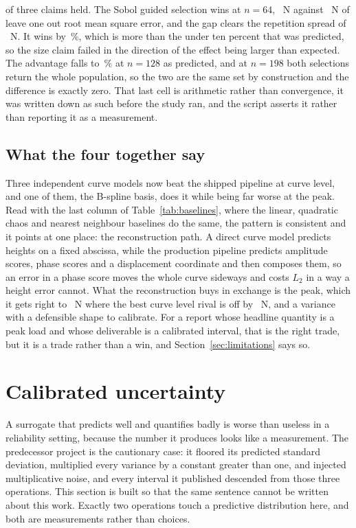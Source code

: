 \documentclass[11pt,a4paper]{article}
\begin{document}
\AblationFiveClaimsHeld{} of three claims held. The Sobol guided selection wins at $n = 64$,
\AblationFiveSobolSmall~N against \AblationFiveRandomSmall~N of leave one out root mean square
error, and the gap clears the repetition spread of \AblationFiveSpreadSmall~N. It wins by
\AblationFiveAdvantageSmall\,\%, which is more than the under ten percent that was predicted, so
the size claim failed in the direction of the effect being larger than expected. The advantage
falls to \AblationFiveAdvantageMiddle\,\% at $n = 128$ as predicted, and at $n = 198$ both
selections return the whole population, so the two are the same set by construction and the
difference is exactly zero. That last cell is arithmetic rather than convergence, it was written
down as such before the study ran, and the script asserts it rather than reporting it as a
measurement.

\subsection{What the four together say}
Three independent curve models now beat the shipped pipeline at curve level, and one of them,
the B-spline basis, does it while being far worse at the peak. Read with the last column of
Table~\ref{tab:baselines}, where the linear, quadratic chaos and nearest neighbour baselines do
the same, the pattern is consistent and it points at one place: the reconstruction path. A
direct curve model predicts heights on a fixed abscissa, while the production pipeline predicts
amplitude scores, phase scores and a displacement coordinate and then composes them, so an error
in a phase score moves the whole curve sideways and costs $L_2$ in a way a height error cannot.
What the reconstruction buys in exchange is the peak, which it gets right to
\AblationFourProductionPeakBias~N where the best curve level rival is off by
\AblationFourPeakBias~N, and a variance with a defensible shape to calibrate. For a report whose
headline quantity is a peak load and whose deliverable is a calibrated interval, that is the
right trade, but it is a trade rather than a win, and Section~\ref{sec:limitations} says so.

\section{Calibrated uncertainty}
\label{sec:calibration}
A surrogate that predicts well and quantifies badly is worse than useless in a reliability
setting, because the number it produces looks like a measurement. The predecessor project is
the cautionary case: it floored its predicted standard deviation, multiplied every variance by
a constant greater than one, and injected multiplicative noise, and every interval it published
descended from those three operations. This section is built so that the same sentence cannot
be written about this work. Exactly two operations touch a predictive distribution here, and
both are measurements rather than choices.
\end{document}
